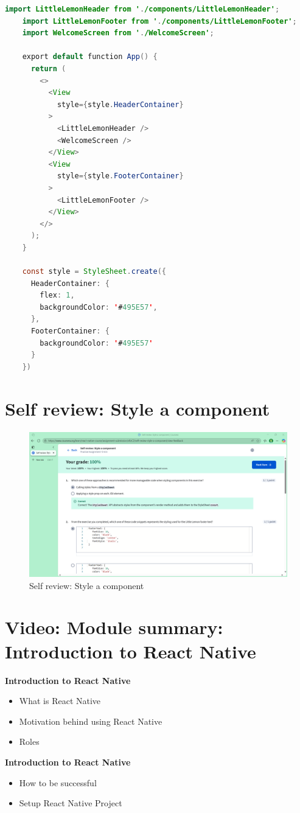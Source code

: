 \begin{itemize}
\begin{lstlisting}[language=Java, numbers=none]
    import LittleLemonHeader from './components/LittleLemonHeader';
    import LittleLemonFooter from './components/LittleLemonFooter';
    import WelcomeScreen from './WelcomeScreen';

    export default function App() {
      return (
        <>
          <View
            style={style.HeaderContainer}
          >
            <LittleLemonHeader />
            <WelcomeScreen />
          </View>
          <View 
            style={style.FooterContainer}
          >
            <LittleLemonFooter />
          </View>
        </>
      );
    }

    const style = StyleSheet.create({
      HeaderContainer: {
        flex: 1,
        backgroundColor: '#495E57',
      },
      FooterContainer: {
        backgroundColor: '#495E57'
      }
    })
  \end{lstlisting}
\end{itemize}

\section{Self review: Style a component}
\begin{figure}[H]
  \centering
  \includegraphics[width=0.5\linewidth]{images/self-review-4.png}
  \caption{Self review: Style a component}
\end{figure}

\section{Video: Module summary: Introduction to React Native}
\textbf{Introduction to React Native}
\begin{itemize}
  \item What is React Native
  \item Motivation behind using React Native
  \item Roles
\end{itemize}

\textbf{Introduction to React Native}
\begin{itemize}
  \item How to be successful
  \item Setup React Native Project
\end{itemize}

